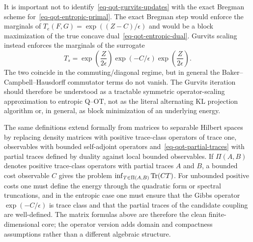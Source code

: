 \begin{rem}
	It is important not to identify~\eqref{eq-qot-gurvits-updates} with the exact Bregman scheme for~\eqref{eq-qot-entropic-primal}. The exact Bregman step would enforce the marginals of $T_e(F,G)=\exp((Z-C)/\epsilon)$ and would be a block maximization of the true concave dual~\eqref{eq-qot-entropic-dual}. Gurvits scaling instead enforces the marginals of the surrogate
\[
	T_s=
	\exp\!\left(\frac{Z}{2\epsilon}\right)
	\exp(-C/\epsilon)
	\exp\!\left(\frac{Z}{2\epsilon}\right).
\]
		The two coincide in the commuting/diagonal regime, but in general the Baker--Campbell--Hausdorff commutator terms do not vanish. The Gurvits iteration should therefore be understood as a tractable symmetric operator-scaling approximation to entropic Q--OT, not as the literal alternating KL projection algorithm or, in general, as block minimization of an underlying energy.
\end{rem}

\begin{rem}
	The same definitions extend formally from matrices to separable Hilbert spaces by replacing density matrices with positive trace-class operators of trace one, observables with bounded self-adjoint operators and~\eqref{eq-qot-partial-traces} with partial traces defined by duality against local bounded observables. If $\Pi(A,B)$ denotes positive trace-class operators with partial traces $A$ and $B$, a bounded cost observable $C$ gives the problem $\inf_{T\in\Pi(A,B)}\operatorname{Tr}(CT)$. For unbounded positive costs one must define the energy through the quadratic form or spectral truncations, and in the entropic case one must ensure that the Gibbs operator $\exp(-C/\epsilon)$ is trace class and that the partial traces of the candidate coupling are well-defined. The matrix formulas above are therefore the clean finite-dimensional core; the operator version adds domain and compactness assumptions rather than a different algebraic structure.
\end{rem}

